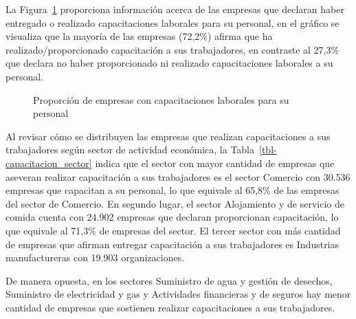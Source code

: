 \documentclass[
  11pt,
]{article}
\begin{document}
La Figura~\ref{fig-capacitacion} proporciona información acerca de las
empresas que declaran haber entregado o realizado capacitaciones
laborales para su personal, en el gráfico se visualiza que la mayoría de
las empresas (72,2\%) afirma que ha realizado/proporcionado capacitación
a sus trabajadores, en contraste al 27,3\% que declara no haber
proporcionado ni realizado capacitaciones laborales a su personal.

\begin{figure}[H]

\caption{\label{fig-capacitacion}Proporción de empresas con
capacitaciones laborales para su personal}


\end{figure}%

Al revisar cómo se distribuyen las empresas que realizan capacitaciones
a sus trabajadores según sector de actividad económica, la
Tabla~\ref{tbl-capacitacion_sector} indica que el sector con mayor
cantidad de empresas que aseveran realizar capacitación a sus
trabajadores es el sector Comercio con 30.536 empresas que capacitan a
su personal, lo que equivale al 65,8\% de las empresas del sector de
Comercio. En segundo lugar, el sector Alojamiento y de servicio de
comida cuenta con 24.902 empresas que declaran proporcionan
capacitación, lo que equivale al 71,3\% de empresas del sector. El
tercer sector con más cantidad de empresas que afirman entregar
capacitación a sus trabajadores es Industrias manufactureras con 19.903
organizaciones.

De manera opuesta, en los sectores Suministro de agua y gestión de
desechos, Suministro de electricidad y gas y Actividades financieras y
de seguros hay menor cantidad de empresas que sostienen realizar
capacitaciones a sus trabajadores.
\end{document}
